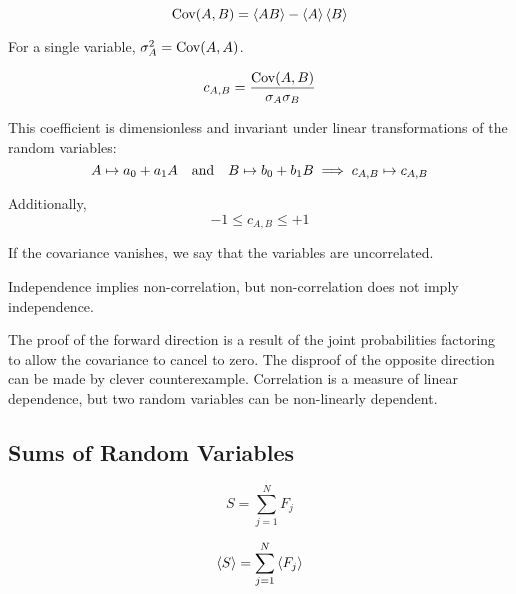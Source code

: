 \documentclass[a4paper,twoside,master.tex]{subfiles}
\begin{document}
\begin{definition}[Covariance]
    \begin{equation}
        \Cov(A,B) = \ev{AB} - \ev{A} \ev{B}
    \end{equation}
\end{definition}

For a single variable, $ \sigma^2_A = \mathrm{Cov}(A,A) $.

\begin{definition}
    \begin{equation}
        c_{A,B} = \frac{\mathrm{Cov}(A,B)}{\sigma_A \sigma_B}
    \end{equation}
\end{definition}

This coefficient is dimensionless and invariant under linear transformations of the random variables:
\begin{equation}
    A \mapsto a_0 + a_1 A \qand B \mapsto b_0 + b_1 B \implies c_{A,B} \mapsto c_{A,B}
\end{equation}

Additionally,
\begin{equation}
    -1 \leq c_{A,B} \leq +1
\end{equation}

\begin{definition}[Correlation]
    If the covariance vanishes, we say that the variables are uncorrelated.

    Independence implies non-correlation, but non-correlation does not imply independence.

    The proof of the forward direction is a result of the joint probabilities factoring to allow the covariance to cancel to zero. The disproof of the opposite direction can be made by clever counterexample. Correlation is a measure of linear dependence, but two random variables can be non-linearly dependent.
\end{definition}

\subsection{Sums of Random Variables}
\label{sub:sums_of_random_variables}

\begin{equation}
    S = \sum_{j=1}^{N} F_j
\end{equation}

\begin{equation}
    \ev{S} = \sum_{j=1}^{N} \ev{F_j}
\end{equation}
\end{document}
